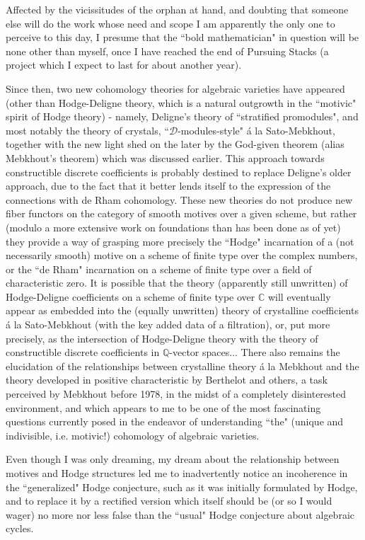 \label{note:53} Affected by the vicissitudes of the orphan at hand, and doubting that someone else will do the work whose need and scope I am apparently the only one to perceive to this day, I presume that the ``bold mathematician" in question will be none other than myself, once I have reached the end of Pursuing Stacks (a project which I expect to last for about another year).

\label{note:54} Since then, two new cohomology theories for algebraic varieties have appeared (other than Hodge-Deligne theory, which is a natural outgrowth in the ``motivic" spirit of Hodge theory) - namely, Deligne's theory of ``stratified promodules", and most notably the theory of crystals, ``$\mathcal{D}$-modules-style" \'a la Sato-Mebkhout, together with the new light shed on the later by the God-given theorem (alias Mebkhout's theorem) which was discussed earlier. This approach towards constructible discrete coefficients is probably destined to replace Deligne's older approach, due to the fact that it better lends itself to the expression of the connections with de Rham cohomology. These new theories do not produce new fiber functors on the category of smooth motives over a given scheme, but rather (modulo a more extensive work on foundations than has been done as of yet) they provide a way of grasping more precisely the ``Hodge" incarnation of a (not necessarily smooth) motive on a scheme of finite type over the complex numbers, or the ``de Rham" incarnation on a scheme of finite type over a field of characteristic zero. It is possible that the theory (apparently still unwritten) of Hodge-Deligne coefficients on a scheme of finite type over $\mathbb{C}$ will eventually appear as embedded into the (equally unwritten) theory of crystalline coefficients \'a la Sato-Mebkhout (with the key added data of a filtration), or, put more precisely, as the intersection of Hodge-Deligne theory with the theory of constructible discrete coefficients in $\mathbb{Q}$-vector spaces... There also remains the elucidation of the relationships between crystalline theory \'a la Mebkhout and the theory developed in positive characteristic by Berthelot and others, a task perceived by Mebkhout before 1978, in the midst of a completely disinterested environment, and which appears to me to be one of the most fascinating questions currently posed in the endeavor of understanding ``the" (unique and indivisible, i.e. motivic!) cohomology of algebraic varieties.

\label{note:55}Even though I was only dreaming, my dream about the relationship between motives and Hodge structures led me to inadvertently notice an incoherence in the ``generalized" Hodge conjecture, such as it was initially formulated by Hodge, and to replace it by a rectified version which itself should be (or so I would wager) no more nor less false than the ``usual" Hodge conjecture about algebraic cycles.


